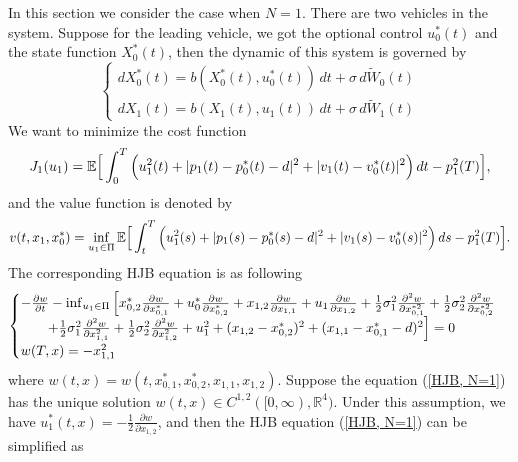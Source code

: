 \documentclass{article}
\begin{document}
In this section we consider the case when $N = 1$. There are two vehicles in the system. Suppose for the leading vehicle, we got the optional control $u_{0}^{*} (t)$ and the state function $X_{0}^{*} (t)$, then the dynamic of this system is governed by
\begin{equation}
    \begin{cases}
   d X_{0}^{*}(t) = b(X_{0}^{*}(t), u_{0}^{*}(t)) \, d t + \sigma \, d \widetilde{W}_{0}(t)  \\
   d X_{1}(t) = b(X_{1} (t), u_{1} (t)) \, d t + \sigma \, d \widetilde{W}_{1}(t)
   \end{cases}
\end{equation}
We want to minimize the cost function
\begin{equation*}
    J_{1} (u_{1}) = \mathbb{E} \Big{[} \int_{0}^{T} \Big{(} u_{1}^{2}(t) + |p_{1}(t) - p_{0}^{*}(t) - d|^{2} + |v_{1}(t) - v_{0}^{*}(t)|^{2} \Big{)} \, d t - p_{1}^{2}(T) \Big{]},
\end{equation*}
and the value function is denoted by
\begin{equation*}
    v(t, x_{1}, x_{0}^{*}) = \inf_{u_{1} \in \Pi} \mathbb{E} \Big{[} \int_{t}^{T} \Big{(} u_{1}^{2}(s) + |p_{1}(s) - p_{0}^{*}(s) - d|^{2} + |v_{1}(s) - v_{0}^{*}(s)|^{2} \Big{)} \, d s - p_{1}^{2}(T) \Big{]}.
\end{equation*}
The corresponding HJB equation is as following
\begin{equation} \label{HJB, N=1}
    \begin{cases}
   - \frac{\partial w}{\partial t} - \inf_{u_{1} \in \Pi} \Big{[} x_{0,2}^{*} \frac{\partial w}{\partial x_{0, 1}^{*}} + u_{0}^{*} \frac{\partial w}{\partial x_{0, 2}^{*}} + x_{1,2} \frac{\partial w}{\partial x_{1, 1}} + u_{1} \frac{\partial w}{\partial x_{1, 2}} + \frac{1}{2} \sigma_{1}^{2} \frac{\partial^{2} w}{\partial x_{0, 1}^{* 2}} + \frac{1}{2} \sigma_{2}^{2} \frac{\partial^{2} w}{\partial x_{0, 2}^{* 2}}  \\
   \qquad + \frac{1}{2} \sigma_{1}^{2} \frac{\partial^{2} w}{\partial x_{1, 1}^{2}} + \frac{1}{2} \sigma_{2}^{2} \frac{\partial^{2} w}{\partial x_{1, 2}^{2}} + u_{1}^{2} + (x_{1, 2} - x_{0, 2}^{*})^{2} + (x_{1, 1} - x_{0, 1}^{*} - d)^{2} \Big{]}   = 0  \\
   w(T, x) = - x_{1, 1}^{2}
   \end{cases}
\end{equation}
where $w(t, x) = w(t, x_{0, 1}^{*}, x_{0, 2}^{*}, x_{1, 1}, x_{1, 2})$. Suppose the equation (\ref{HJB, N=1}) has the unique solution $w(t,x) \in C^{1,2}([0, \infty), \mathbb{R}^{4})$. Under this assumption, we have $u_{1}^{*}(t, x) = - \frac{1}{2} \frac{\partial w}{\partial x_{1, 2}}$, and then the HJB equation (\ref{HJB, N=1}) can be simplified as
\end{document}
